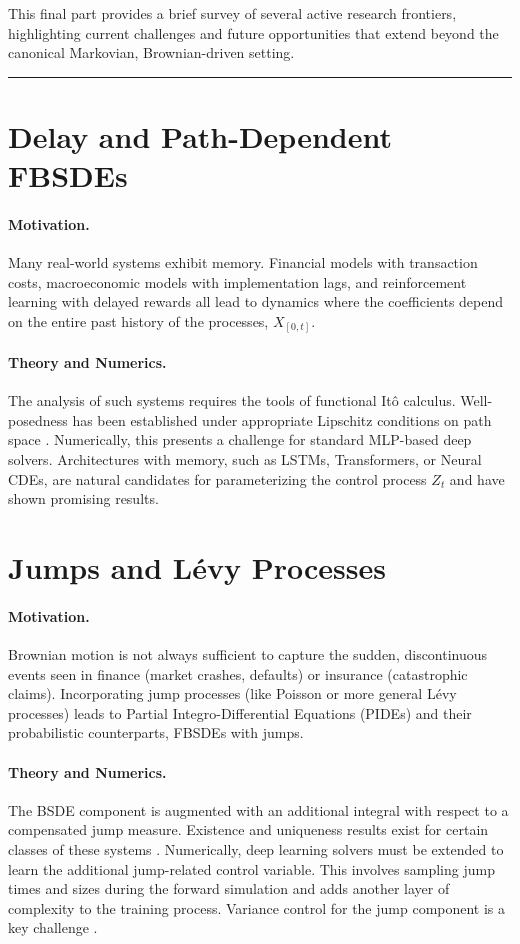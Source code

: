 This final part provides a brief survey of several active research frontiers, highlighting current challenges and future opportunities that extend beyond the canonical Markovian, Brownian-driven setting.

\bigskip\hrule\bigskip

\section{Delay and Path-Dependent FBSDEs}
\label{sec:path_dependence}

\paragraph{Motivation.} Many real-world systems exhibit memory. Financial models with transaction costs, macroeconomic models with implementation lags, and reinforcement learning with delayed rewards all lead to dynamics where the coefficients depend on the entire past history of the processes, \(X_{[0,t]}\).

\paragraph{Theory and Numerics.} The analysis of such systems requires the tools of functional Itô calculus. Well-posedness has been established under appropriate Lipschitz conditions on path space \cite{ContFournie2013}. Numerically, this presents a challenge for standard MLP-based deep solvers. Architectures with memory, such as LSTMs, Transformers, or Neural CDEs, are natural candidates for parameterizing the control process \(Z_t\) and have shown promising results.

\section{Jumps and Lévy Processes}
\label{sec:jumps}

\paragraph{Motivation.} Brownian motion is not always sufficient to capture the sudden, discontinuous events seen in finance (market crashes, defaults) or insurance (catastrophic claims). Incorporating jump processes (like Poisson or more general Lévy processes) leads to Partial Integro-Differential Equations (PIDEs) and their probabilistic counterparts, FBSDEs with jumps.

\paragraph{Theory and Numerics.} The BSDE component is augmented with an additional integral with respect to a compensated jump measure. Existence and uniqueness results exist for certain classes of these systems \cite{BarlesBuckdahnPardoux1997}. Numerically, deep learning solvers must be extended to learn the additional jump-related control variable. This involves sampling jump times and sizes during the forward simulation and adds another layer of complexity to the training process. Variance control for the jump component is a key challenge \cite{Bachouch2022}.


